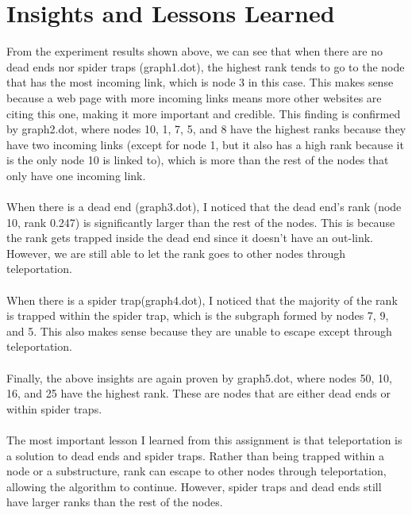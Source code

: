 \documentclass[9pt,twoside]{exam}
\begin{document}
\section*{Insights and Lessons Learned}
From the experiment results shown above, we can see that when there are no dead ends nor spider traps (graph1.dot), the highest rank tends to go to the node that has the most incoming link, which is node 3 in this case. This makes sense because a web page with more incoming links means more other websites are citing this one, making it more important and credible. This finding is confirmed by graph2.dot, where nodes 10, 1, 7, 5, and 8 have the highest ranks because they have two incoming links (except for node 1, but it also has a high rank because it is the only node 10 is linked to), which is more than the rest of the nodes that only have one incoming link.\\\\
When there is a dead end (graph3.dot), I noticed that the dead end's rank (node 10, rank 0.247) is significantly larger than the rest of the nodes. 
This is because the rank gets trapped inside the dead end since it doesn't have an out-link. However, we are still able to let the rank goes to other nodes through teleportation. \\\\
When there is a spider trap(graph4.dot), I noticed that the majority of the rank is trapped within the spider trap, which is the subgraph formed by nodes 7, 9, and 5. This also makes sense because they are unable to escape except through teleportation. \\\\
Finally, the above insights are again proven by graph5.dot, where nodes 50, 10, 16, and 25 have the highest rank. These are nodes that are either dead ends or within spider traps. \\\\
The most important lesson I learned from this assignment is that teleportation is a solution to dead ends and spider traps. Rather than being trapped within a node or a substructure, rank can escape to other nodes through teleportation, allowing the algorithm to continue. However, spider traps and dead ends still have larger ranks than the rest of the nodes.
\end{document}
